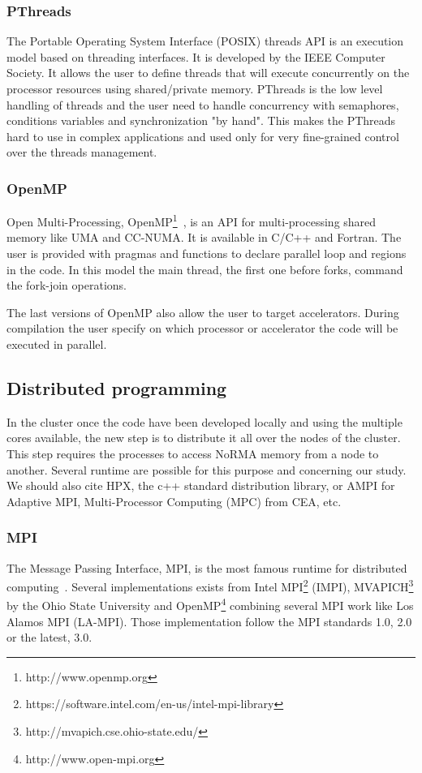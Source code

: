 \subsubsection{PThreads}
The Portable Operating System Interface (POSIX) threads API is an execution model based on threading interfaces. 
It is developed by the IEEE Computer Society. 
It allows the user to define threads that will execute concurrently on the processor resources using shared/private memory.
PThreads is the low level handling of threads and the user need to handle concurrency with semaphores, conditions variables and synchronization "by hand".
This makes the PThreads hard to use in complex applications and used only for very fine-grained control over the threads management. 

\subsubsection{OpenMP}
Open Multi-Processing, OpenMP\footnote{http://www.openmp.org}~\cite{chapman2008using,supinski2017scaling}, is an API for multi-processing shared memory like UMA and CC-NUMA.
It is available in C/C++ and Fortran.
The user is provided with pragmas and functions to declare parallel loop and regions in the code. 
In this model the main thread, the first one before forks, command the fork-join operations. 

The last versions of OpenMP also allow the user to target accelerators. 
During compilation the user specify on which processor or accelerator the code will be executed in parallel. 

\subsection{Distributed programming}
In the cluster once the code have been developed locally and using the multiple cores available, the new step is to distribute it all over the nodes of the cluster. 
This step requires the processes to access NoRMA memory from a node to another. 
Several runtime are possible for this purpose and concerning our study. 
We should also cite HPX, the c++ standard distribution library, or AMPI for Adaptive MPI, Multi-Processor Computing (MPC) from CEA, etc.

\subsubsection{MPI}
The Message Passing Interface, MPI, is the most famous runtime for distributed computing~\cite{gropp2014using,gropp2015using}.
Several implementations exists from Intel MPI\footnote{https://software.intel.com/en-us/intel-mpi-library} (IMPI), MVAPICH\footnote{http://mvapich.cse.ohio-state.edu/} by the Ohio State University and OpenMP\footnote{http://www.open-mpi.org} combining several MPI work like Los Alamos MPI (LA-MPI).
Those implementation follow the MPI standards 1.0, 2.0 or the latest, 3.0. 


